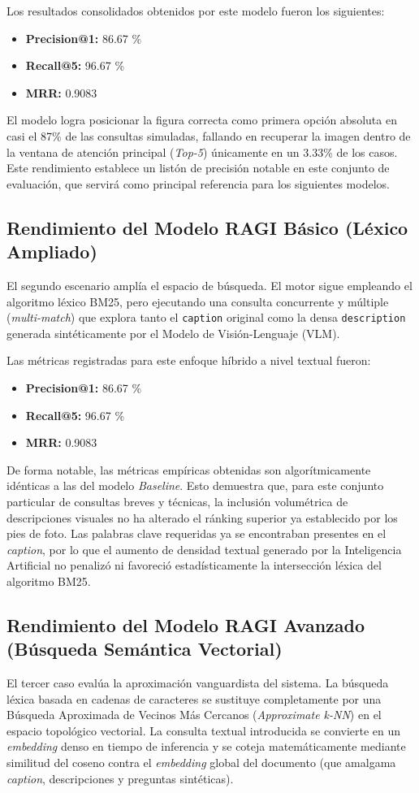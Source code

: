 \documentclass[a4paper]{report}
\begin{document}
Los resultados consolidados obtenidos por este modelo fueron los siguientes:
\begin{itemize}
    \item \textbf{Precision@1:} 86.67 \%
    \item \textbf{Recall@5:} 96.67 \%
    \item \textbf{MRR:} 0.9083
\end{itemize}

El modelo logra posicionar la figura correcta como primera opción absoluta en casi el 87\% de las consultas simuladas, fallando en recuperar la imagen dentro de la ventana de atención principal (\textit{Top-5}) únicamente en un 3.33\% de los casos. Este rendimiento establece un listón de precisión notable en este conjunto de evaluación, que servirá como principal referencia para los siguientes modelos.

\subsection{Rendimiento del Modelo RAGI Básico (Léxico Ampliado)}
El segundo escenario amplía el espacio de búsqueda. El motor sigue empleando el algoritmo léxico BM25, pero ejecutando una consulta concurrente y múltiple (\textit{multi-match}) que explora tanto el \texttt{caption} original como la densa \texttt{description} generada sintéticamente por el Modelo de Visión-Lenguaje (VLM).

Las métricas registradas para este enfoque híbrido a nivel textual fueron:
\begin{itemize}
    \item \textbf{Precision@1:} 86.67 \%
    \item \textbf{Recall@5:} 96.67 \%
    \item \textbf{MRR:} 0.9083
\end{itemize}

De forma notable, las métricas empíricas obtenidas son algorítmicamente idénticas a las del modelo \textit{Baseline}. Esto demuestra que, para este conjunto particular de consultas breves y técnicas, la inclusión volumétrica de descripciones visuales no ha alterado el ránking superior ya establecido por los pies de foto. Las palabras clave requeridas ya se encontraban presentes en el \textit{caption}, por lo que el aumento de densidad textual generado por la Inteligencia Artificial no penalizó ni favoreció estadísticamente la intersección léxica del algoritmo BM25.

\subsection{Rendimiento del Modelo RAGI Avanzado (Búsqueda Semántica Vectorial)}
El tercer caso evalúa la aproximación vanguardista del sistema. La búsqueda léxica basada en cadenas de caracteres se sustituye completamente por una Búsqueda Aproximada de Vecinos Más Cercanos (\textit{Approximate k-NN}) en el espacio topológico vectorial. La consulta textual introducida se convierte en un \textit{embedding} denso en tiempo de inferencia y se coteja matemáticamente mediante similitud del coseno contra el \textit{embedding} global del documento (que amalgama \textit{caption}, descripciones y preguntas sintéticas).
\end{document}
